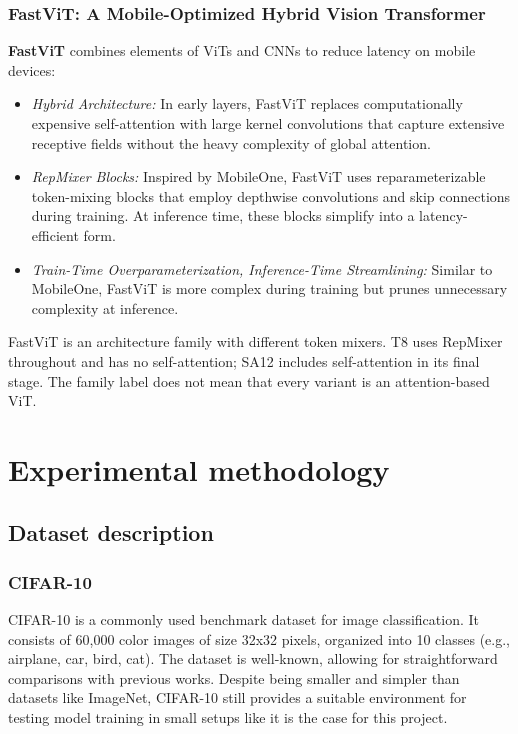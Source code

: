 \documentclass[12pt]{article}
\begin{document}
\subsubsection*{FastViT: A Mobile-Optimized Hybrid Vision Transformer}
\textbf{FastViT} \cite{vasu2023fastvitfasthybridvision} combines elements of ViTs and CNNs to reduce latency on mobile devices:
\begin{itemize}
    \item \textit{Hybrid Architecture:} In early layers, FastViT replaces computationally expensive self-attention with large kernel convolutions that capture extensive receptive fields without the heavy complexity of global attention.
    \item \textit{RepMixer Blocks:} Inspired by MobileOne, FastViT uses reparameterizable token-mixing blocks that employ depthwise convolutions and skip connections during training. At inference time, these blocks simplify into a latency-efficient form.
    \item \textit{Train-Time Overparameterization, Inference-Time Streamlining:} Similar to MobileOne, FastViT is more complex during training but prunes unnecessary complexity at inference.
\end{itemize}
FastViT is an architecture family with different token mixers. T8 uses RepMixer throughout and has no self-attention; SA12 includes self-attention in its final stage. The family label does not mean that every variant is an attention-based ViT.

\section{Experimental methodology}

\subsection{Dataset description}

\subsubsection{CIFAR-10}
CIFAR-10 is a commonly used benchmark dataset for image classification. It consists of 60,000 color images of size 32x32 pixels, organized into 10 classes (e.g., airplane, car, bird, cat). The dataset is well-known, allowing for straightforward comparisons with previous works. Despite being smaller and simpler than datasets like ImageNet, CIFAR-10 still provides a suitable environment for testing model training in small setups like it is the case for this project.
\end{document}
